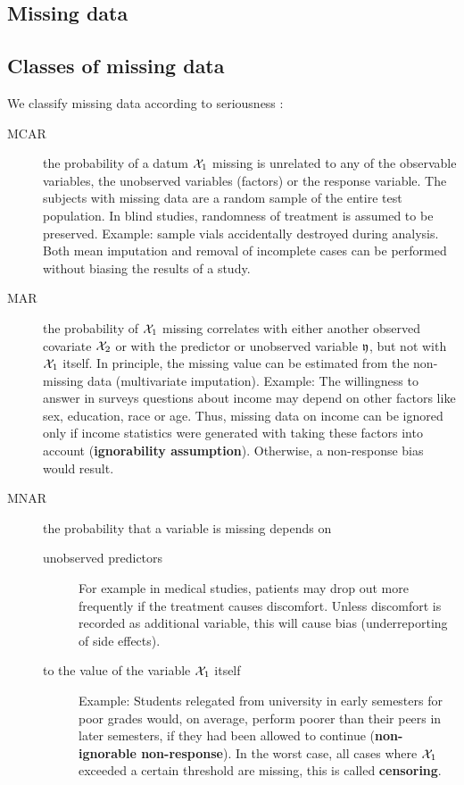 \begin{refsection}
\section{Missing data}

\subsection{Classes of missing data}

We classify missing data according to seriousness \parencite{Rub-76,Ste-18}:
\begin{description}
  \item[\acf{MCAR}]{the probability of a datum \(\mathcal{X}_1 \) missing is unrelated to any of the observable variables, the unobserved variables (factors) or the response variable. The subjects with missing data are a random sample of the entire test population. In blind studies, randomness of treatment is assumed to be preserved. Example: sample vials accidentally destroyed during analysis. Both mean imputation and removal of incomplete cases can be performed without biasing the results of a study. }
  \item[\acf{MAR}]{the probability of \(\mathcal{X}_1 \) missing correlates with either another observed covariate \(\mathcal{X}_2 \) or with the predictor or unobserved variable \(\mathfrak{y} \), but not with \(\mathcal{X}_1 \) itself. In principle, the missing value can be estimated from the non-missing data (multivariate imputation). Example: The willingness to answer in surveys questions about income may depend on other factors like sex, education, race or age. Thus, missing data on income can be ignored only if income statistics were generated with taking these factors into account (\textbf{ignorability assumption}). Otherwise, a non-response bias would result.  }
  \item[\acf{MNAR}]{the probability that a variable is missing depends on
      \begin{description}
        \item[unobserved predictors]{For example in medical studies, patients may drop out more frequently if the treatment causes discomfort. Unless discomfort is recorded as additional variable, this will cause bias (underreporting of side effects).}
        \item[to the value of the variable \(\mathcal{X}_1 \) itself]{Example: Students relegated from university in early semesters for poor grades would, on average, perform poorer than their peers in later semesters, if they had been allowed to continue (\textbf{non-ignorable non-response}). In the worst case, all cases where \(\mathcal{X}_1 \) exceeded a certain threshold are missing, this is called \textbf{censoring}. }

\end{description}}
\end{description}
\end{refsection}
